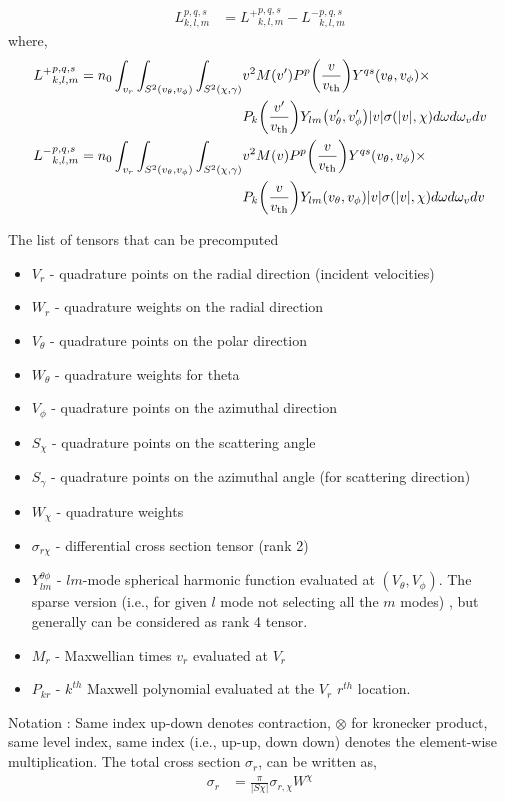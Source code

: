 \documentclass{article}
\begin{document}
\begin{align*}
    {L}_{k,l,m}^{p,q,s} &= {L^{+}}_{k,l,m}^{p,q,s} - {L^{-}}_{k,l,m}^{p,q,s}
\end{align*} where, 
\begin{align*}
    {L^{+}}_{k,l,m}^{p,q,s} = n_0 \int_{v_r} 
                               \int_{S^2(v_\theta,v_\phi)}
                               \int_{S^2(\chi,\gamma)} & 
                               v^2 M(v^\prime) P^p \of{\frac{v}{\vth}} Y^{qs}\of{v_\theta, v_\phi} \times \\ & P_k\of{\frac{v^\prime}{\vth}} Y_{lm}\of{v_\theta^\prime, v_\phi^\prime} |v|\sigma(|v|,\chi) d\omega d\omega_v dv \\
    {L^{-}}_{k,l,m}^{p,q,s} = n_0 \int_{v_r} 
                              \int_{S^2(v_\theta,v_\phi)}
                              \int_{S^2(\chi,\gamma)} & 
                              v^2 M(v) P^p \of{\frac{v}{\vth}} Y^{qs}\of{v_\theta, v_\phi} \times \\ & P_k\of{\frac{v}{\vth}} Y_{lm}\of{v_\theta, v_\phi} |v|\sigma(|v|,\chi) d\omega d\omega_v dv
\end{align*}

The list of tensors that can be precomputed
\begin{itemize}
    \item $V_r$ - quadrature points on the radial direction (incident velocities)
    \item $W_r$ - quadrature weights on the radial direction
    \item $V_\theta$ - quadrature points on the polar direction 
    \item $W_\theta$ - quadrature weights for theta
    \item $V_\phi$ - quadrature points on the azimuthal direction 
    \item $S_\chi$ - quadrature points on the scattering angle
    \item $S_\gamma$ - quadrature points on the azimuthal angle (for scattering direction)
    \item $W_\chi$ - quadrature weights
    \item $\sigma_{r\chi}$ - differential cross section tensor (rank 2)
    \item $Y_{lm}^{\theta\phi}$ - $lm$-mode spherical harmonic function evaluated at $(V_\theta, V_\phi)$. The sparse version (i.e., for given $l$ mode not selecting all the $m$ modes) , but generally can be considered as rank 4 tensor. 
    \item $M_r$ - Maxwellian times $v_r$ evaluated at $V_r$
    \item $P_{kr}$     - $k^{th}$ Maxwell polynomial evaluated at the $V_r$ $r^{th}$ location.
\end{itemize}
Notation : Same index up-down denotes contraction, $\otimes$ for kronecker product, same level index, same index (i.e., up-up, down down) denotes the element-wise multiplication. 
The total cross section $\sigma_r$, can be written as, 
\begin{align}
    \sigma_r &= \frac{\pi}{|S\chi|} \sigma_{r,\chi} W^\chi
\end{align}
\end{document}
